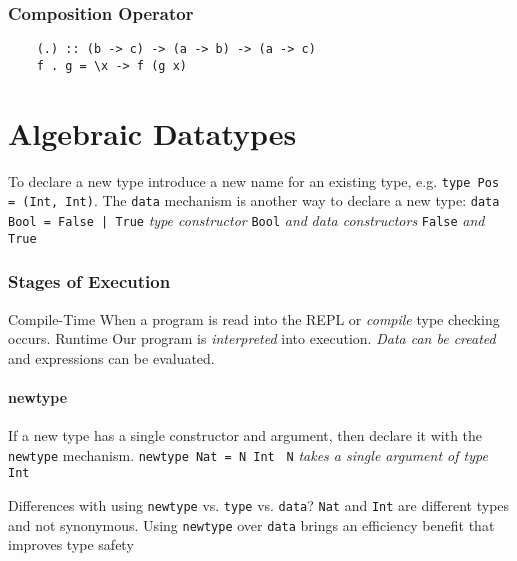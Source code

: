 \documentclass{article}
\begin{document}
\subsubsection*{Composition Operator}
\begin{verbatim}
    (.) :: (b -> c) -> (a -> b) -> (a -> c)
    f . g = \x -> f (g x)
\end{verbatim}

\section{Algebraic Datatypes}
To declare a new type introduce a new name for an existing type, e.g.
\texttt{type Pos = (Int, Int)}.
The \textcolor{Emerald}{\texttt{data}} mechanism is another way to declare a new type: \newline
\texttt{data Bool = False | True} \textcolor{Rhodamine}{\emph{type constructor}} \textcolor{Emerald}{\texttt{Bool}} \emph{and} \textcolor{Rhodamine}{\emph{data constructors}} \textcolor{Emerald}{\texttt{False}} \emph{and} \textcolor{Emerald}{\texttt{True}}

\subsubsection*{Stages of Execution}
\textcolor{NavyBlue}{Compile-Time} When a program is read into the REPL or \textcolor{Rhodamine}{\emph{compile}} type checking occurs. \newline
\textcolor{NavyBlue}{Runtime} Our program is \textcolor{Rhodamine}{\emph{interpreted}} into execution. \textcolor{Rhodamine}{\emph{Data can be created}} and expressions can be evaluated.

\paragraph{newtype} If a new type has a single constructor and argument, then declare it with the \texttt{newtype} mechanism. \newline
\texttt{newtype Nat = N Int       } \texttt{\textcolor{Emerald}{N}} \textcolor{Rhodamine}{\emph{takes a single argument of type}} \texttt{\textcolor{Emerald}{Int}} \newline

\noindent Differences with using \textcolor{Emerald}{\texttt{newtype}} vs. \textcolor{Emerald}{\texttt{type}} vs.
\textcolor{Emerald}{\texttt{data}}? \newline
\noindent\textcolor{Emerald}{\texttt{Nat}} and \textcolor{Emerald}{\texttt{Int}} are different types and not synonymous.
Using \textcolor{Emerald}{\texttt{newtype}} over \textcolor{Emerald}{\texttt{data}} brings an efficiency benefit that improves type safety
\end{document}
